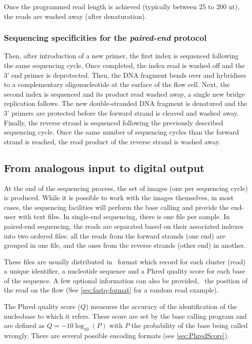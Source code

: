 Once the programmed read length is achieved (typically between 25 to 200 \gls{nt}),
the reads are washed away (after denaturation).

\subsubsection{Sequencing specificities for the \emph{paired-end} protocol}

Then, after introduction of a new primer, the first index is sequenced
following the same sequencing cycle.
Once completed, the index read is washed off and the 3' end primer is deprotected.
Then, the \gls{DNA} fragment bends over and hybridises to a complementary
oligonucleotide at the surface of the flow cell.
Next, the second index is sequenced and its product read washed away,
a single new bridge replication follows.
The new double-stranded \gls{DNA} fragment is denatured and the 3' primers are
protected before the forward strand is cleaved and washed away.
Finally, the reverse strand is sequenced following the previously described
sequencing cycle. Once the same number of sequencing cycles than the forward
strand is reached, the read product of the reverse strand is washed away.

\subsection{From analogous input to digital output}

At the end of the sequencing process, the set of images (one per sequencing cycle)
is produced. While it is possible to work with the images themselves, in most
cases, the sequencing facilities will perform the base calling and provide the
end-user with text files. In single-end sequencing, there is one file per sample.
In paired-end sequencing, the reads are separated based on their associated
indexes into two ordered files: all the reads from the forward strands (one end)
are grouped in one file, and the ones from the reverse strands (other end)
in another.

These files are usually distributed in \fastq\ format
 which record for each cluster (read) a unique identifier,
a nucleotide sequence and a \gls{Phred} quality score for each base of the
sequence. A few optional information can also be provided, \eg\
the position of the read on the \gls{flow} (See \cref{sec:fastq-format} for
a random read example).

The \gls{Phred} quality score ($Q$) measures the accuracy of the identification
of the nucleobase to which it refers. These score are set by the base calling
program and are defined as $Q = -10\log_{10}(P)$ with $P$ the probability of
the base being called wrongly. There are several possible encoding formats
(see \cref{sec:PhredScore}).

